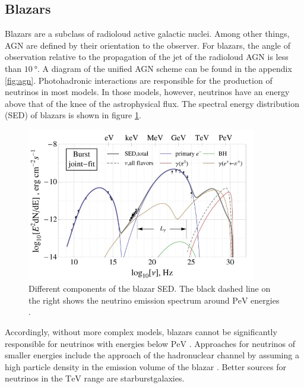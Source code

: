 \subsection{Blazars}
Blazars are a subclass of radioloud active galactic nuclei.
Among other things, AGN are defined by their orientation to the observer.
For blazars, the angle of observation relative to the propagation of the jet of the radioloud AGN is less than $\SI{10}{\degree}$.
A diagram of the unified AGN scheme can be found in the appendix \ref{fig:agn}.
Photohadronic interactions are responsible for the production of neutrinos in most models.
In those models, however, neutrinos have an energy above that of the knee of the astrophysical flux.
The spectral energy distribution (SED) of blazars is shown in figure \ref{fig:sed}.
\begin{figure}
    \centering
    \includegraphics[width=10cm]{Plots/01_5_astroparticle/sed.jpeg}
    \caption{Different components of the blazar SED. The black dashed line on the right shows the neutrino emission spectrum around $\si{\peta\electronvolt}$ energies \cite{sed}.}
    \label{fig:sed}
\end{figure}
Accordingly, without more complex models, blazars cannot be significantly responsible for neutrinos with energies below $\si{\peta\electronvolt}$ \cite{blazar}.
Approaches for neutrinos of smaller energies include the approach of the hadronuclear channel by assuming a high particle density in the emission volume of the blazar \cite{eichmann}.
Better sources for neutrinos in the $\si{\tera\electronvolt}$ range are starburstgalaxies.

